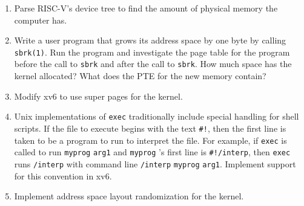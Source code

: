 \begin{enumerate}
  
\item Parse RISC-V's device tree to find the amount of physical memory
the computer has.

\item Write a user program that grows its address space by one byte by calling
\lstinline{sbrk(1)}.
Run the  program and investigate the page table for the program before the call
to
\lstinline{sbrk}
and after the call to
\lstinline{sbrk}.
How much space has the kernel allocated?  What does the
PTE
for the new memory contain?

\item Modify xv6 to use super pages for the kernel.

\item Unix implementations of
\lstinline{exec}
traditionally include special handling for shell scripts.
If the file to execute begins with the text
\lstinline{#!},
then the first line is taken to be a program
to run to interpret the file.
For example, if
\lstinline{exec}
is called to run
\lstinline{myprog}
\lstinline{arg1}
and
\lstinline{myprog} 's
first line is
\lstinline{#!/interp},
then
\lstinline{exec}
runs
\lstinline{/interp}
with command line
\lstinline{/interp}
\lstinline{myprog}
\lstinline{arg1}.
Implement support for this convention in xv6.

\item Implement address space layout randomization for the kernel.

\end{enumerate}
